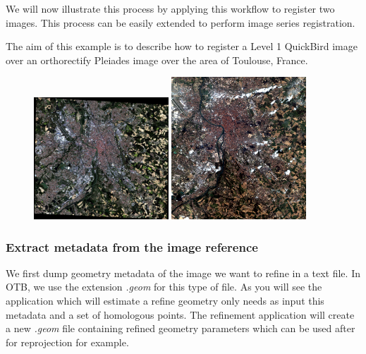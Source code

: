 We will now illustrate this process by applying this workflow to register two
images. This process can be easily extended to perform image series
registration.

The aim of this example is to describe how to register a Level 1 QuickBird image
over an orthorectify Pleiades image over the area of Toulouse, France.


\begin{figure}[!h]
  \center
  \includegraphics[width=0.45\textwidth]{../Art/MonteverdiImages/registration_pleiades_ql.png}
  \includegraphics[width=0.45\textwidth]{../Art/MonteverdiImages/registration_quickbird_ql.png}
  \label{fig:InputImagesRegistration}
\end{figure}


\subsubsection{Extract metadata from the image reference}

We first dump geometry metadata of the image we want to refine in a text
file. In OTB, we use the extension \textit{.geom} for this type of file. As you
will see the application which will estimate a refine geometry only needs as
input this metadata and a set of homologous points. The refinement application
will create a new \textit{.geom} file containing refined geometry parameters
which can be used after for reprojection for example.

